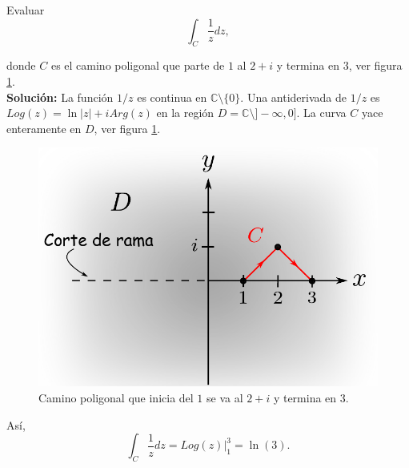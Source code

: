 \begin{ejemplo}
Evaluar 
$$\int_C \frac{1}{z} dz,$$

donde $C$ es el camino poligonal que parte de $1$ al $2+i$ y termina en $3$, ver figura \ref{fig:EjTFC1}.
\\

\textbf{Solución:} La función $1/z$ es continua en $\mathbb{C} \setminus \{0\}$. Una antiderivada de $1/z$ es $Log(z) = \ln |z| + i Arg(z)$ en la región $D = \mathbb{C}\setminus ]-\infty, 0]$. La curva $C$ yace enteramente en $D$, ver figura \ref{fig:EjTFC1}.

   \begin{figure}[H]
        \centering
        \includegraphics[scale = 0.5]{Figuras/Ejemplo_TFCIntegralLinea1.pdf}
        \caption{Camino poligonal que inicia del $1$ se va al $2+i$ y termina en $3$.}
        \label{fig:EjTFC1}
    \end{figure}
    
Así, 
$$\int_C \frac{1}{z} dz = \left. Log(z) \right|_1^3 = \ln(3).$$
\end{ejemplo}

